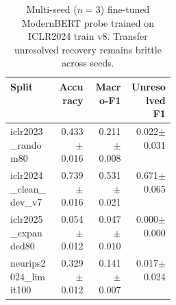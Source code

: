 \begin{table}[t]
\centering
\scriptsize
\setlength{\tabcolsep}{3pt}
\begin{tabular}{p{0.28\linewidth}rrr}
\toprule
Split & Accuracy & Macro-F1 & Unresolved F1 \\
\midrule
iclr2023\_random80 & 0.433$\pm$0.016 & 0.211$\pm$0.008 & 0.022$\pm$0.031 \\
iclr2024\_clean\_dev\_v7 & 0.739$\pm$0.016 & 0.531$\pm$0.021 & 0.671$\pm$0.065 \\
iclr2025\_expanded80 & 0.054$\pm$0.012 & 0.047$\pm$0.010 & 0.000$\pm$0.000 \\
neurips2024\_limit100 & 0.329$\pm$0.012 & 0.141$\pm$0.007 & 0.017$\pm$0.024 \\
\bottomrule
\end{tabular}
\caption{Multi-seed ($n=3$) fine-tuned ModernBERT probe trained on ICLR2024 train v8. Transfer unresolved recovery remains brittle across seeds.}
\label{tab:finetuned-modernbert-multiseed}
\end{table}
